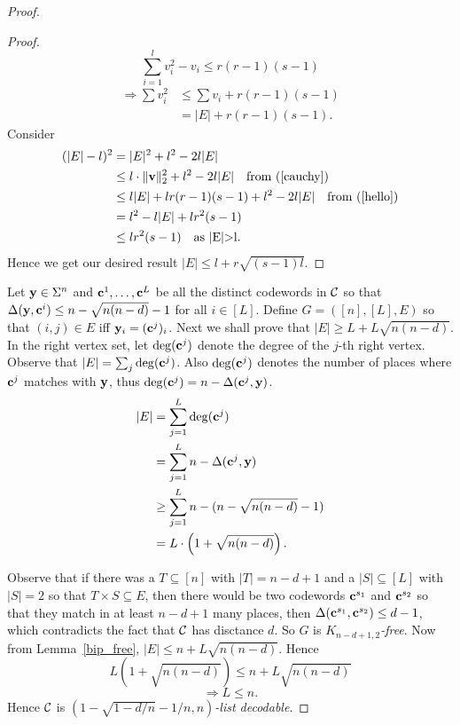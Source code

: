 \begin{proof}
\begin{proof}
			  \[
				\sum_{i = 1}^l v_i^2-v_i \leq r(r-1)(s-1)
				\]
			 \begin{align}
				\Rightarrow\sum v_i^2
				& \leq \sum v_i + r(r-1)(s-1)\\
				\label{hello}
				& = |E| + r(r-1)(s-1).
			 \end{align}
			 Consider
			 \begin{align*}
				(|E|-l)^2 
				& = |E|^2 + l^2 - 2l|E| \\
				& \leq l\cdot\lVert \bfv \rVert_2^2 + l^2 - 2l|E| \quad \text{from (\ref{cauchy})} \\
				& \leq l|E| + lr(r-1)(s-1) + l^2 -2l|E| \quad \text{from (\ref{hello})} \\
				& = l^2 - l|E| + lr^2(s-1) \\
				& \leq lr^2(s-1) \quad \text{as |E|>l}.
			 \end{align*}
			 Hence we get our desired result $|E|\leq l + r\sqrt{(s-1)l}$.
		\end{proof}
       Let $\mathbf{y}\in\Sigma^n$ and $\mathbf{c}^1, \ldots, \mathbf{c}^L$ be all the distinct codewords in $\mathcal{C}$ so that $\Delta(\mathbf{y}, \mathbf{c}^i) \leq n - \sqrt{n(n-d)} - 1$ for all $i\in[L]$. Define $G = ([n],[L],E)$ so that $(i,j)\in E$ iff $\mathbf{y}_i = (\mathbf{c}^j)_i$. Next we shall prove that $|E|\geq L + L\sqrt{n(n-d)}$. In the right vertex set, let $\deg(\mathbf{c}^j)$ denote the degree of the $j$-th right vertex. Observe that $|E|=\sum_j \deg(\mathbf{c}^j)$. Also $\deg(\mathbf{c}^j)$ denotes the number of places where $\mathbf{c}^j$ matches with $\mathbf{y}$, thus $\deg(\mathbf{c}^j) = n - \Delta(\mathbf{c}^j, \mathbf{y})$. 
       \begin{align*}
       		|E|
       		& = \sum_{j=1}^L \deg(\mathbf{c}^j)\\
       		& = \sum_{j=1}^L n - \Delta(\mathbf{c}^j, \mathbf{y})\\
       		& \geq \sum_{j=1}^L n - (n-\sqrt{n(n-d)} - 1)\\
       		& = L\cdot\left(1 + \sqrt{n(n-d)}\right).
       \end{align*}
       
	Observe that if there was a $T\subseteq[n]$ with $|T| = n-d+1$ and a $|S|\subseteq[L]$ with $|S| =2$ so that $T\times S\subseteq E$, then there would be two codewords $\mathbf{c}^{s_1}$ and $\mathbf{c}^{s_2}$ so that they match in at least $n-d+1$ many places, then $\Delta(\mathbf{c}^{s_1}, \mathbf{c}^{s_2})\leq d-1$, which contradicts the fact that $\mathcal{C}$ has disctance $d$. So $G$ is $K_{n-d+1, 2}$\emph{-free}. Now from Lemma~\ref{bip_free}, $|E|\leq n + L\sqrt{n(n-d)}$. Hence 
	\[
		L\left(1 + \sqrt{n(n-d)}\right) \leq n + L\sqrt{n(n-d)}
	\]
	\[
	\Rightarrow L \leq n.
	\]
	Hence $\mathcal{C}$ is $(1 - \sqrt{1- d/n} - 1/n, n)$\emph{-list decodable}.
	\end{proof}
	
